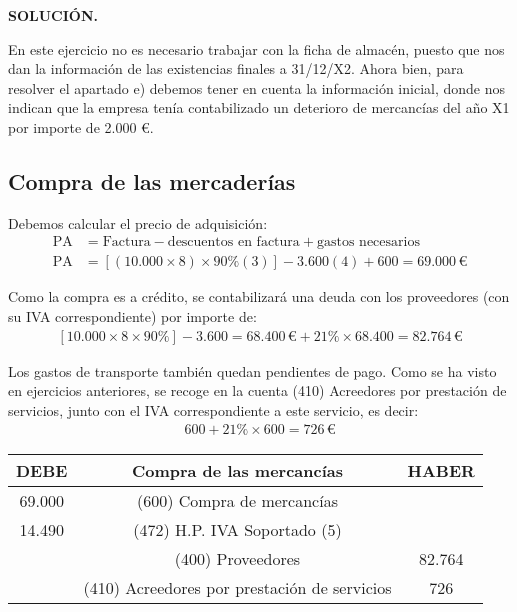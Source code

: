 \documentclass{article}
\begin{document}
\textbf{SOLUCIÓN.}

En este ejercicio no es necesario trabajar con la ficha de almacén, puesto que nos dan la información de las existencias finales a 31/12/X2. Ahora bien, para resolver el apartado e) debemos tener en cuenta la información inicial, donde nos indican que la empresa tenía contabilizado un deterioro de mercancías del año X1 por importe de 2.000 €.

\subsection*{ Compra de las mercaderías}

Debemos calcular el precio de adquisición:
\begin{align*}
    \text{PA} &= \text{Factura} - \text{descuentos en factura} + \text{gastos necesarios} \\
    \text{PA} &= \left[ (10.000 \times 8) \times 90\% (3) \right] - 3.600(4) + 600 = 69.000 \, \text{€}
\end{align*}

Como la compra es a crédito, se contabilizará una deuda con los proveedores (con su IVA correspondiente) por importe de:
\begin{align*}
    \left[ 10.000 \times 8 \times 90\% \right] - 3.600 = 68.400 \, \text{€} + 21\% \times 68.400 = 82.764 \, \text{€}
\end{align*}

Los gastos de transporte también quedan pendientes de pago. Como se ha visto en ejercicios anteriores, se recoge en la cuenta (410) Acreedores por prestación de servicios, junto con el IVA correspondiente a este servicio, es decir:
\begin{align*}
    600 + 21\% \times 600 = 726 \, \text{€}
\end{align*}

\begin{table}[H]
\centering
\begin{tabular}{|c|c|c|}
\hline
\textbf{DEBE} & \textbf{Compra de las mercancías} & \textbf{HABER} \\
\hline
69.000 & (600) Compra de mercancías & \\
14.490 & (472) H.P. IVA Soportado (5)& \\
& (400) Proveedores & 82.764 \\
& (410) Acreedores por prestación de servicios & 726 \\
\hline
\end{tabular}
\end{table}
\end{document}
